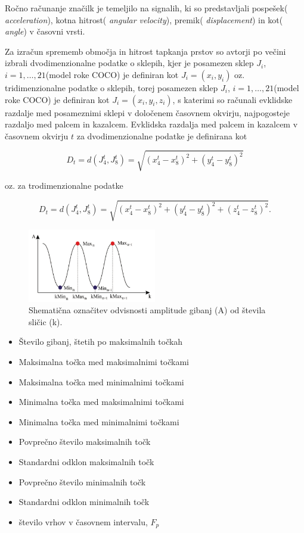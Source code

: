 \documentclass[
]{article}
\providecommand{\tightlist}{%
  \setlength{\itemsep}{0pt}\setlength{\parskip}{0pt}}
\begin{document}
Ročno računanje značilk je temeljilo na signalih, ki so predstavljali
pospešek( \emph{acceleration}), kotna hitrost( \emph{angular velocity}),
premik( \emph{displacement}) in kot( \emph{angle}) v časovni vrsti.

Za izračun sprememb območja in hitrost tapkanja prstov so avtorji po
večini izbrali dvodimenzionalne podatke o sklepih, kjer je posamezen
sklep \(J_i\), \(i = 1, \dots, 21\)(model roke COCO) je definiran kot
\(J_i = (x_i, y_i)\) oz. tridimenzionalne podatke o sklepih, torej
posamezen sklep \(J_i\), \(i = 1, \dots, 21\)(model roke COCO) je
definiran kot \(J_i = (x_i, y_i, z_i)\), s katerimi so računali
evklidske razdalje med posameznimi sklepi v določenem časovnem okvirju,
najpogosteje razdaljo med palcem in kazalcem. Evklidska razdalja med
palcem in kazalcem v časovnem okvirju \(t\) za dvodimenzionalne podatke
je definirana kot

\[
D_t = d(J_4^t, J_8^t) = \sqrt{(x_4^t - x_8^t)^2 + (y_4^t - y_8^t)^2}
\]

oz. za trodimenzionalne podatke

\[
D_t = d(J_4^t, J_8^t) = \sqrt{(x_4^t - x_8^t)^2 + (y_4^t - y_8^t)^2 + (z_4^t - z_8^t)^2}.
\]

\begin{figure}
\centering
\includegraphics[width=0.5\textwidth,height=\textheight]{slike/featursi.png}
\caption{Shematična označitev odvisnosti amplitude gibanj (A) od števila
sličic (k).}
\end{figure}

\begin{itemize}
\tightlist
\item
  Število gibanj, štetih po maksimalnih točkah
\item
  Maksimalna točka med maksimalnimi točkami
\item
  Maksimalna točka med minimalnimi točkami
\item
  Minimalna točka med maksimalnimi točkami
\item
  Minimalna točka med minimalnimi točkami
\item
  Povprečno število maksimalnih točk
\item
  Standardni odklon maksimalnih točk
\item
  Povprečno število minimalnih točk
\item
  Standardni odklon minimalnih točk
\item
  število vrhov v časovnem intervalu, \(F_p\)
\end{itemize}
\end{document}

